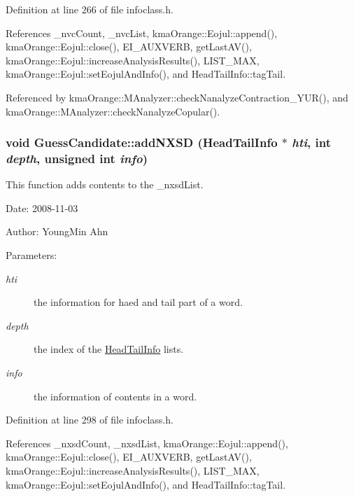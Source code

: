 Definition at line 266 of file infoclass.h.

References \_\-nvcCount, \_\-nvcList, kmaOrange::Eojul::append(), kmaOrange::Eojul::close(), EI\_\-AUXVERB, getLastAV(), kmaOrange::Eojul::increaseAnalysisResults(), LIST\_\-MAX, kmaOrange::Eojul::setEojulAndInfo(), and HeadTailInfo::tagTail.

Referenced by kmaOrange::MAnalyzer::checkNanalyzeContraction\_\-YUR(), and kmaOrange::MAnalyzer::checkNanalyzeCopular().\hypertarget{classGuessCandidate_e2eaac995e76c7f4477fd487eb0147b9}{
\subsubsection[{addNXSD}]{\setlength{\rightskip}{0pt plus 5cm}void GuessCandidate::addNXSD ({\bf HeadTailInfo} $\ast$ {\em hti}, \/  int {\em depth}, \/  unsigned int {\em info})}}
\label{classGuessCandidate_e2eaac995e76c7f4477fd487eb0147b9}


This function adds contents to the \_\-nxsdList. 

\begin{Desc}
\item[Date:]2008-11-03 \end{Desc}
\begin{Desc}
\item[Author:]YoungMin Ahn \end{Desc}
\begin{Desc}
\item[Parameters:]
\begin{description}
\item[{\em hti}]the information for haed and tail part of a word. \item[{\em depth}]the index of the \hyperlink{classHeadTailInfo}{HeadTailInfo} lists. \item[{\em info}]the information of contents in a word. \end{description}
\end{Desc}


Definition at line 298 of file infoclass.h.

References \_\-nxsdCount, \_\-nxsdList, kmaOrange::Eojul::append(), kmaOrange::Eojul::close(), EI\_\-AUXVERB, getLastAV(), kmaOrange::Eojul::increaseAnalysisResults(), LIST\_\-MAX, kmaOrange::Eojul::setEojulAndInfo(), and HeadTailInfo::tagTail.

